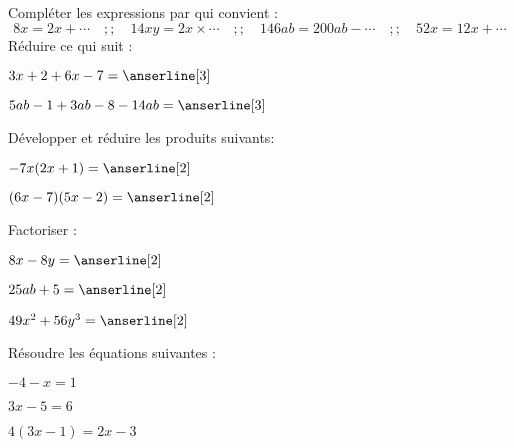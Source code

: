 \documentclass[a4paper,addpoints,12pt]{exam}
\begin{document}
\devoir[sem=2,prv=false,ds=true,num=4 ,niv=1 ,date=02/03/2023]

\begin{exo}[14]
\begin{questions}
\question[2] Compléter les expressions par qui convient :
\[
 8x = 2x + \cdots\quad ;; \quad
 14xy = 2x \times \cdots\quad ;; \quad
 146 ab = 200 ab - \cdots\quad ;; \quad
 52 x = 12 x + \cdots
\]
\question[2] Réduire ce qui suit :
\begin{multicols}{2}
\(
3x+2+6x-7=\anserline[3]
\)
\columnbreak

\(
5ab-1+3ab-8-14ab=\anserline[3]
\)
\end{multicols}
\vspace{-1cm}
\question[4] Développer et réduire les produits suivants:
\begin{multicols}{2}
\(
-7x(2x+1)=\anserline[2]
\)
\columnbreak

\(
(6x-7)(5x-2)=\anserline[2]
\)
\end{multicols}
\vspace{-1cm}
\question[6] Factoriser :
\begin{multicols}{3}
\(
8x-8y=\anserline[2]
\)
\columnbreak

\(
25ab+5=\anserline[2]
\)
\columnbreak

\(
49x^{2}+56y^{3}=\anserline[2]
\)
\end{multicols}

\end{questions}
\end{exo}

\begin{exo}[6]
\begin{questions}
\question[6] Résoudre les équations suivantes :
\end{questions}

\begin{multicols}{3}
\(-4-x=1\)

\anserline[4]
\columnbreak

\(3x-5=6\)

\anserline[4]
\columnbreak

\(4(3x-1)=2x-3\)

\anserline[4]
\end{multicols}

\end{exo}
\end{document}
